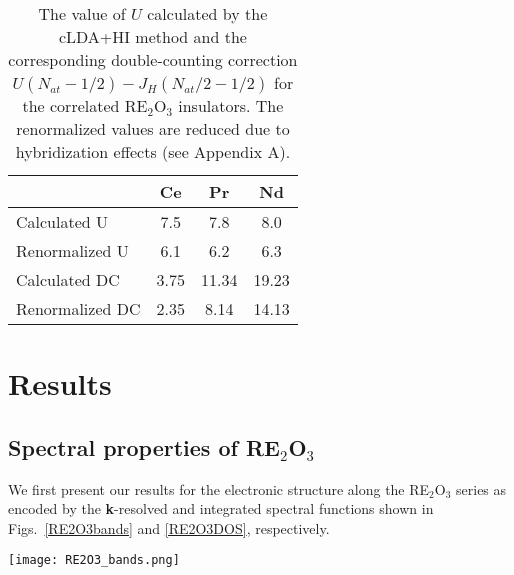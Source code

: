 \documentclass[aps,prb,twocolumn,amsmath,amssymb]{revtex4}
\def\vk{{\bf k}}
\begin{document}
 
\begin{table}[!h]
\begin{center}
\begin{ruledtabular}
	\renewcommand{\arraystretch}{1.2}
\begin{tabular}{l c c c }
      & Ce & Pr & Nd  \\
  \hline
    Calculated U & 7.5 & 7.8 & 8.0 \\
  
     Renormalized U & 6.1 & 6.2 & 6.3\\
  
    Calculated DC & 3.75 & 11.34 & 19.23 \\
  
     Renormalized DC & 2.35 & 8.14 & 14.13 \\
\end{tabular}
\end{ruledtabular}
 \caption{\label{Parameters} The value of $U$ calculated by the cLDA+HI  method and the corresponding double-counting correction $U(N_{at}-1/2)-J_H(N_{at}/2-1/2)$ for the correlated RE$_2$O$_3$ insulators. The renormalized values are reduced due to hybridization effects  (see Appendix A).}
 \end{center}
\end{table}



\section{Results}


\subsection{ Spectral properties of RE$_2$O$_3$}


We first present our results for the electronic structure along the RE$_2$O$_3$ series as encoded  by the \vk-resolved and integrated spectral functions shown in  Figs.~\ref{RE2O3bands} and \ref{RE2O3DOS}, respectively.   

\begin{figure*}[t!]
 	\begin{centering}
 		\texttt{[image: RE2O3\_bands.png]}
 		\par\end{centering}
 	\caption{\vk-resolved spectral functions calculated by the mBJ@DFT+DMFT method of RE$_2$O$_3$. White color indicates a high contribution of the RE 4$f$ character. The energy is relative to the top of the O 2$p$ band. The thick dashed line is the computed chemical potential.} 
 	\label{RE2O3bands} 
 \end{figure*} 
\end{document}
